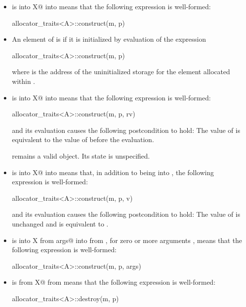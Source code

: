 \begin{itemize}
\item
{} is 
{ into X@ into }
means that the following expression is well-formed:
\begin{codeblock}
allocator_traits<A>::construct(m, p)
\end{codeblock}

\item
An element of  is  if it is initialized
by evaluation of the expression
\begin{codeblock}
allocator_traits<A>::construct(m, p)
\end{codeblock}
where  is the address of the uninitialized storage for the element
allocated within .

\item
{} is 
{ into X@ into }
means that the following expression
is well-formed:
\begin{codeblock}
allocator_traits<A>::construct(m, p, rv)
\end{codeblock}
and its evaluation causes the following postcondition to hold: The value
of  is equivalent to the value of  before the evaluation.
\begin{note}
 remains a valid object. Its state is unspecified.
\end{note}

\item
{} is 
{ into X@ into }
means that, in addition to  being  into
, the following expression is well-formed:
\begin{codeblock}
allocator_traits<A>::construct(m, p, v)
\end{codeblock}
and its evaluation causes the following postcondition to hold:
The value of  is unchanged and is equivalent to .

\item
{} is
{ into X from args@ into  from },
for zero
or more arguments , means that the following expression is well-formed:
\begin{codeblock}
allocator_traits<A>::construct(m, p, args)
\end{codeblock}

\item
{} is
{ from X@ from }
means that the following expression is well-formed:
\begin{codeblock}
allocator_traits<A>::destroy(m, p)
\end{codeblock}
\end{itemize}

